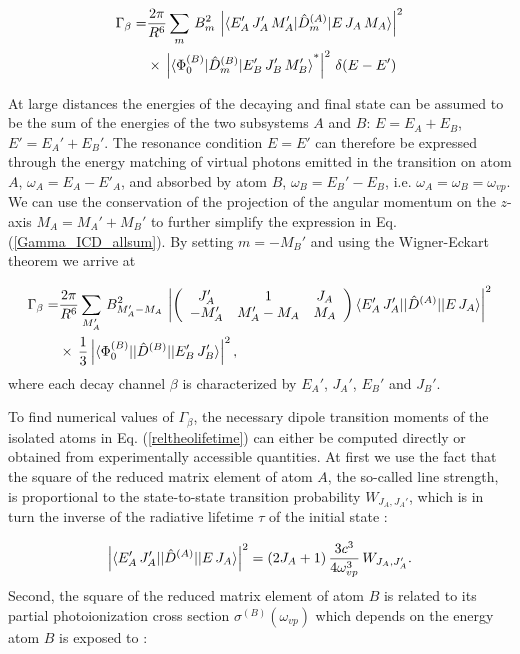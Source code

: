 \begin{align}
\label{Gamma_ICD_allsum}
\Gamma_\beta =& \frac{2\pi}{R^6} \sum\limits_{m} \, B_{m}^2 \, \left| \braket{E'_A\, J'_A\, M'_A | \hat{D}^{(A)}_{m} | E\, J_A\, M_A}\right|^2 \nonumber\\
        & \times\, \left| \braket{\Phi_0^{(B)} | \hat{D}^{(B)}_{m} | E'_B\, J'_B\, M_B'}^* \right|^2\, \delta (E-E')
\end{align}

At large distances the energies of the decaying and final state can be
assumed to be the sum of the energies of the two subsystems
$A$ and $B$: $E=E_A+E_B$, $E'=E_A'+E_B'$. The resonance condition $E=E'$
can therefore be expressed through the energy matching of virtual photons
emitted in the transition on atom $A$, $\omega_A=E_A-E'_A$, and absorbed
by atom $B$, $\omega_B=E_B'-E_B$, i.e. $\omega_A=\omega_B=\omega_{vp}$.
We can use the conservation of the projection of the angular momentum on
the $z$-axis $M_A=M_A'+M_B'$ to further simplify the expression in
Eq. (\ref{Gamma_ICD_allsum}). By setting $m=-M_B'$ and using the
Wigner-Eckart theorem \cite{EdmondsAngular} we arrive at

\begin{align}\label{reltheolifetime}
 \Gamma_\beta =& \frac{2\pi}{R^6} \sum\limits_{M_A'} \, B_{M_A'-M_A}^2 \, \left| \left(
\begin{array}{ccc}
J_A'  & 1        & J_A\\
-M_A' & M_A'-M_A & M_A
\end{array}\right)
 \braket{E'_A\, J'_A || \hat{D}^{(A)} || E\, J_A}\right|^2 \nonumber\\
        & \times\, \frac 13  \left| \braket{\Phi_0^{(B)} || \hat{D}^{(B)} || E'_B\, J'_B} \right|^2,
\end{align}
where each decay channel $\beta$ is characterized by $E_A'$, $J_A'$, $E_B'$
and $J_B'$.

To find numerical values of $\Gamma_\beta$, the necessary dipole transition
moments of the isolated atoms in Eq. (\ref{reltheolifetime}) can either
be computed directly or obtained from experimentally accessible quantities.
At first we use the fact that the square of the reduced matrix element of
atom $A$, the so-called line strength, is proportional to the state-to-state
transition probability $W_{J_A,J_A'}$, which is in turn the inverse of the
radiative lifetime $\tau$ of the initial state \cite{Sobelman72}:

\begin{equation}
\label{sysa_emission}
  \left| \braket{E'_A\, J'_A || \hat{D}^{(A)} || E\, J_A} \right|^2 = (2J_A +1)\, \frac{3c^3}{4\omega_{vp}^3}\, W_{J_A,J_A'} .
\end{equation}
Second, the square of the reduced matrix element of atom $B$ is related
to its partial  photoionization cross section $\sigma^{(B)}(\omega_{vp})$
which depends on the energy atom $B$ is exposed to \cite{Sobelman72}:

